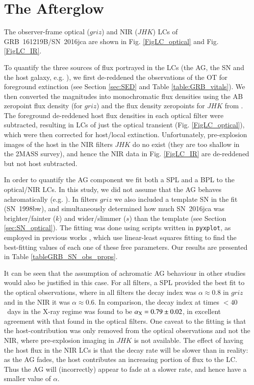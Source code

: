 \documentclass[traditabstract,longauth]{aa}
\begin{document}
\section{The Afterglow}
\label{sec:AG}

The observer-frame optical ($griz$) and NIR ($JHK$) LCs of GRB~161219B/SN~2016jca are shown in Fig. \ref{FigLC_optical} and Fig. \ref{FigLC_IR}.  

To quantify the three sources of flux portrayed in the LCs (the AG, the SN and the host galaxy, e.g. \citealt{Zeh04}), we first de-reddened the observations of the OT for foreground extinction (see Section \ref{sec:SED} and Table \ref{table:GRB_vitals}).  We then converted the magnitudes into monochromatic flux densities using the AB zeropoint flux density (for $griz$) and the flux density zeropoints for $JHK$ from \cite{Greiner08}.  The foreground de-reddened host flux densities in each optical filter were subtracted, resulting in LCs of just the optical transient (Fig. \ref{FigLC_optical}), which were then corrected for host/local extinction.  Unfortunately, pre-explosion images of the host in the NIR filters $JHK$ do no exist (they are too shallow in the 2MASS survey), and hence the NIR data in Fig. \ref{FigLC_IR} are de-reddened but not host subtracted.

In order to quantify the AG component we fit both a SPL and a BPL to the optical/NIR LCs.  In this study, we did not assume that the AG behaves achromatically (e.g. \citealt{Klose04,Kann16}).  In filters $griz$ we also included a template SN in the fit (SN~1998bw), and simultaneously determined how much SN~2016jca was brighter/fainter ($k$) and wider/slimmer ($s$) than the template (see Section \ref{sec:SN_optical}).  The fitting was done using scripts written in \texttt{pyxplot}, as employed in previous works \citep{Cano2011a,Cano2011b,Cano+14,Cano15}, which use linear-least squares fitting to find the best-fitting values of each one of these free parameters. Our results are presented in Table \ref{tableGRB_SN_obs_props}.

It can be seen that the assumption of achromatic AG behaviour in other studies would also be justified in this case.  For all filters, a SPL provided the best fit to the optical observations, where in all filters the decay index was $\alpha \approx 0.8$ in $griz$ and in the NIR it was $\alpha\approx 0.6$.  In comparison, the decay index at times $<40$~days in the X-ray regime was found to be $\alpha_{\rm X}=0.79\pm0.02$, in excellent agreement with that found in the optical filters.  One caveat to the fitting is that the host-contribution was only removed from the optical observations and not the NIR, where pre-explosion imaging in $JHK$ is not available.  The effect of having the host flux in the NIR LCs is that the decay rate will be slower than in reality: as the AG fades, the host contributes an increasing portion of flux to the LC.  Thus the AG will (incorrectly) appear to fade at a slower rate, and hence have a smaller value of $\alpha$.
\end{document}
